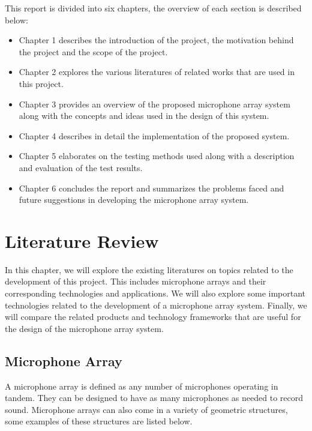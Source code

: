\documentclass[hidelinks,12pt]{report} %
\begin{document}
This report is divided into six chapters, the overview of each section is described below:

	\begin{itemize}
	\item{Chapter 1 describes the introduction of the project, the motivation behind the project and the scope of the project.}
	\item{Chapter 2 explores the various literatures of related works that are used in this project.}
	\item{Chapter 3 provides an overview of the proposed microphone array system along with the concepts and ideas used in the design of this system.}
	\item{Chapter 4 describes in detail the implementation of the proposed system.}
	\item{Chapter 5 elaborates on the testing methods used along with a description and evaluation of the test results.}
	\item{Chapter 6 concludes the report and summarizes the problems faced and future suggestions in developing the microphone array system.}
	\end{itemize}




\chapter{Literature Review}

In this chapter, we will explore the existing literatures on topics related to the development of this project. This includes microphone arrays and their corresponding technologies and applications. We will also explore some important technologies related to the development of a microphone array system. Finally, we will compare the related products and technology frameworks that are useful for the design of the microphone array system. 

\section{Microphone Array}

A microphone array is defined as any number of microphones operating in tandem. They can be designed to have as many microphones as needed to record sound. Microphone arrays can also come in a variety of geometric structures, some examples of these structures are listed below.
\end{document}

